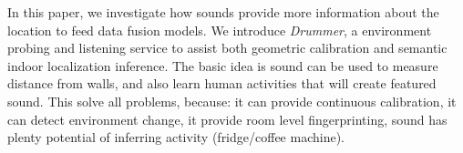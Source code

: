 




In this paper, we investigate how sounds provide more information about the location
to feed data fusion models. We introduce {\em Drummer}, a environment probing and listening service 
to assist both geometric calibration and semantic indoor localization inference. The basic idea is sound 
can be used to measure distance from walls, and also learn human activities that will create featured sound.
This solve all problems, because: it can 
provide continuous calibration, it can detect environment change, 
it provide room level fingerprinting, sound has plenty potential of inferring activity (fridge/coffee machine).


